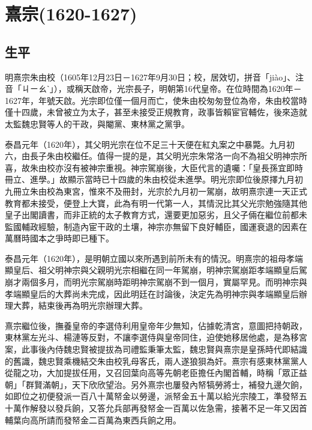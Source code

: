 
\section{熹宗\tiny(1620-1627)}

\subsection{生平}

明熹宗朱由校（1605年12月23日－1627年9月30日；校，居效切，拼音「jiào」、注音「ㄐㄧㄠˋ」），或稱天啟帝，光宗長子，明朝第16代皇帝。在位時間為1620年－1627年，年號天啟。光宗即位僅一個月而亡，使朱由校匆匆登位為帝，朱由校當時僅十四歲，未曾被立为太子，甚至未接受正規教育，政事皆賴宦官輔佐，後來造就太監魏忠賢等人的干政，與閹黨、東林黨之黨爭。

泰昌元年（1620年），其父明光宗在位不足三十天便在紅丸案之中暴斃。九月初六，由長子朱由校繼任。值得一提的是，其父明光宗朱常洛一向不為祖父明神宗所喜，故朱由校亦沒有被神宗重視。神宗駕崩後，大臣代言的遺囑：「皇長孫宜即時冊立、進學。」故顯示當時已十四歲的朱由校從未進學。明光宗即位後原擇九月初九冊立朱由校為東宮，惟來不及冊封，光宗於九月初一駕崩，故明熹宗連一天正式教育都未接受，便登上大寶，此為有明一代第一人，其情況比其父光宗勉強隨其他皇子出閣讀書，而非正統的太子教育方式，還要更加惡劣，且父子倆在繼位前都未監國輔政經驗，制造內宦干政的土壤，神宗亦無留下良好輔臣，國運衰退的因素在萬曆時國本之爭時即已種下。

泰昌元年（1620年），是明朝立國以來所遇到前所未有的情況。明熹宗的祖母孝端顯皇后、祖父明神宗與父親明光宗相繼在同一年駕崩，明神宗駕崩距孝端顯皇后駕崩才兩個多月，而明光宗駕崩時距明神宗駕崩不到一個月，實屬罕見。而明神宗與孝端顯皇后的大葬尚未完成，因此明廷在討論後，決定先為明神宗與孝端顯皇后辦理大葬，結束後再為明光宗辦理大葬。

熹宗繼位後，撫養皇帝的李選侍利用皇帝年少無知，佔據乾清宮，意圖把持朝政，東林黨左光斗、楊漣等反對，不讓李選侍與皇帝同住，迫使她移居他處，是為移宮案，此事後內侍魏忠賢被提拔為司禮監秉筆太監，魏忠賢與熹宗是皇孫時代即結識的舊識，魏忠賢乘機結交朱由校乳母客氏，兩人遂狼狽為奸。熹宗有感東林黨黨人從龍之功，大加提拔任用，又召回葉向高等先朝老臣擔任內閣首輔，時稱「眾正益朝」「群賢滿朝」，天下欣欣望治。另外熹宗也屢發內帑犒勞將士，補發九邊欠餉，如即位之初便發派一百八十萬帑金以勞邊，派帑金五十萬以給光宗陵工，準發帑五十萬作解發以發兵餉，又答允兵部再發帑金一百萬以佐急需，接著不足一年又因首輔葉向高所請而發帑金二百萬為東西兵餉之用。

